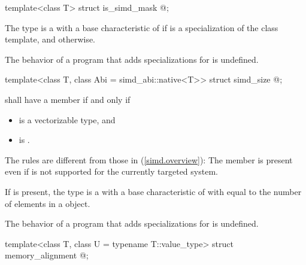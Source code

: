 \begin{itemdecl}
template<class T> struct is_simd_mask { @\seebelow@ };
\end{itemdecl}

\begin{itemdescr}
\pnum
The type  is a  with a base characteristic of  if  is a specialization of the  class template, and  otherwise.

\pnum
The behavior of a program that adds specializations for  is undefined.
\end{itemdescr}

\begin{itemdecl}
template<class T, class Abi = simd_abi::native<T>> struct simd_size { @\seebelow@ };
\end{itemdecl}

\begin{itemdescr}
\pnum
{} shall have a member  if and only if
\begin{itemize}
  \item {} is a vectorizable type, and
  \item {} is .
\end{itemize}
\begin{note}
  The rules are different from those in (\ref{simd.overview}):
  The member  is present even if  is not supported for the currently targeted system.
\end{note}

\pnum
If  is present, the type  is a  with a base characteristic of  with  equal to the number of elements in a  object.

\pnum
The behavior of a program that adds specializations for  is undefined.
\end{itemdescr}

\begin{itemdecl}
template<class T, class U = typename T::value_type> struct memory_alignment { @\seebelow@ };
\end{itemdecl}

